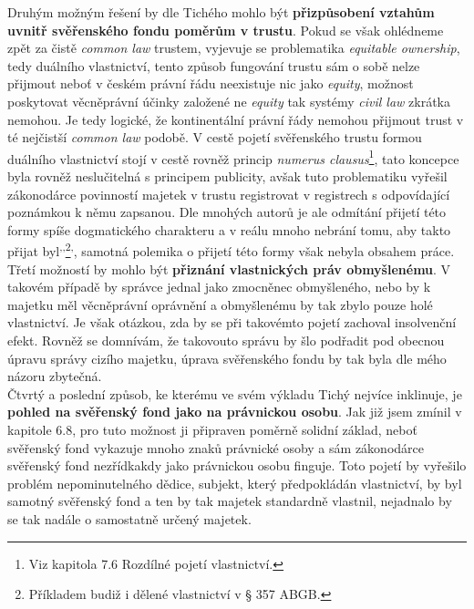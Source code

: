 \documentclass{article}
\begin{document}
Druhým možným řešení by dle Tichého mohlo být \textbf{přizpůsobení vztahům uvnitř svěřenského fondu poměrům v trustu}. Pokud se však ohlédneme zpět za čistě \textit{common law} trustem, vyjevuje se problematika \textit{equitable ownership}, tedy duálního vlastnictví, tento způsob fungování trustu sám o sobě nelze přijmout neboť v českém právní řádu neexistuje nic jako \textit{equity}, možnost poskytovat věcněprávní účinky založené ne \textit{equity} tak systémy \textit{civil law} zkrátka nemohou. Je tedy logické, že kontinentální právní řády nemohou přijmout trust v té nejčistší \textit{common law} podobě. V cestě pojetí svěřenského trustu formou duálního vlastnictví stojí v cestě rovněž princip \textit{numerus clausus}\footnote{Viz kapitola 7.6 Rozdílné pojetí vlastnictví.}, tato koncepce byla rovněž neslučitelná s principem publicity, avšak tuto problematiku vyřešil zákonodárce povinností majetek v trustu registrovat v registrech s odpovídající poznámkou k němu zapsanou. Dle mnohých autorů je ale odmítání přijetí této formy spíše dogmatického charakteru a v reálu mnoho nebrání tomu, aby takto přijat byl\textsuperscript{,}\textsuperscript{,}\footnote{Příkladem budiž i dělené vlastnictví v § 357 ABGB.}\textsuperscript{,}, samotná polemika o přijetí této formy však nebyla obsahem práce.\\

Třetí možností by mohlo být \textbf{přiznání vlastnických práv obmyšlenému}. V takovém případě by správce jednal jako zmocněnec obmyšleného, nebo by k majetku měl věcněprávní oprávnění a obmyšlenému by tak zbylo pouze holé vlastnictví. Je však otázkou, zda by se při takovémto pojetí zachoval insolvenční efekt. Rovněž se domnívám, že takovouto správu by šlo podřadit pod obecnou úpravu správy cizího majetku, úprava svěřenského fondu by tak byla dle mého názoru zbytečná.\\

Čtvrtý a poslední způsob, ke kterému ve svém výkladu Tichý nejvíce inklinuje, je \textbf{pohled na svěřenský fond jako na právnickou osobu}. Jak již jsem zmínil v kapitole 6.8, pro tuto možnost ji připraven poměrně solidní základ, neboť svěřenský fond vykazuje mnoho znaků právnické osoby a sám zákonodárce svěřenský fond nezřídkakdy jako právnickou osobu finguje. Toto pojetí by vyřešilo problém nepominutelného dědice, subjekt, který předpokládán vlastnictví, by byl samotný svěřenský fond a ten by tak majetek standardně vlastnil, nejadnalo by se tak nadále o samostatně určený majetek.\\
\end{document}
